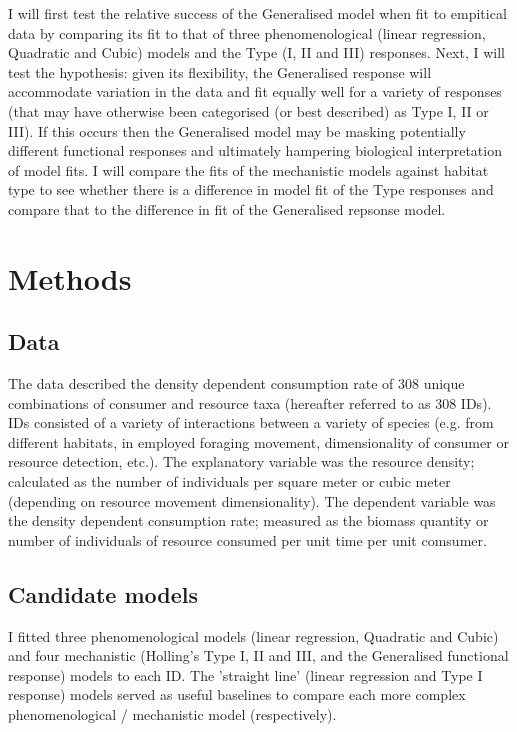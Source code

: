 \documentclass[11pt]{article}
\begin{document}
        I will first test the relative success of the Generalised model when fit to empitical data by comparing its fit to that of three phenomenological (linear regression, Quadratic and Cubic) models and the Type (I, II and III) responses. Next, I will test the hypothesis: given its flexibility, the Generalised response will accommodate variation in the data and fit equally well for a variety of responses (that may have otherwise been categorised (or best described) as Type I, II or III). If this occurs then the Generalised model may be masking potentially different functional responses and ultimately hampering biological interpretation of model fits. I will compare the fits of the mechanistic models against habitat type to see whether there is a difference in model fit of the Type responses and compare that to the difference in fit of the Generalised repsonse model.
            
    \section{Methods}
        \subsection{Data}
            The data described the density dependent consumption rate of 308 unique combinations of consumer and resource taxa (hereafter referred to as 308 IDs). IDs consisted of a variety of interactions between a variety of species (e.g. from different habitats, in employed foraging movement, dimensionality of consumer or resource detection, etc.). The explanatory variable was the resource density; calculated as the number of individuals per square meter or cubic meter (depending on resource movement dimensionality). The dependent variable was the density dependent consumption rate; measured as the biomass quantity or number of individuals of resource consumed per unit time per unit comsumer. 

        \subsection{Candidate models}
            I fitted three phenomenological models (linear regression, Quadratic and Cubic) and four mechanistic (Holling's Type I, II and III, and the Generalised functional response) models to each ID. The 'straight line' (linear regression and Type I response) models served as useful baselines to compare each more complex phenomenological / mechanistic model (respectively).
\end{document}
